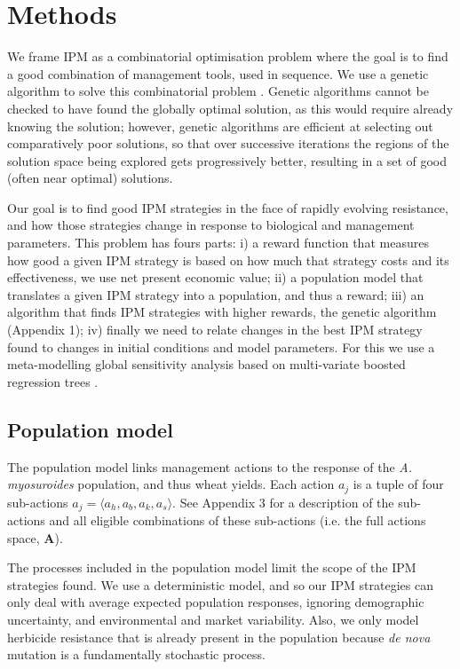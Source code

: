 \documentclass[12pt, a4paper]{article}
\begin{document}
\section*{Methods}
We frame IPM as a combinatorial optimisation problem where the goal is to find a good combination of management tools, used in sequence. We use a genetic algorithm to solve this combinatorial problem \citep{Tayl2004GA, Carr2010}. Genetic algorithms cannot be checked to have found the globally optimal solution, as this would require already knowing the solution; however, genetic algorithms are efficient at selecting out comparatively poor solutions, so that over successive iterations the regions of the solution space being explored gets progressively better, resulting in a set of good (often near optimal) solutions.

Our goal is to find good IPM strategies in the face of rapidly evolving resistance, and how those strategies change in response to biological and management parameters. This problem has fours parts: i) a reward function that measures how good a given IPM strategy is based on how much that strategy costs and its effectiveness, we use net present economic value; ii) a population model that translates a given IPM strategy into a population, and thus a reward; iii) an algorithm that finds IPM strategies with higher rewards, the genetic algorithm (Appendix 1); iv) finally we need to relate changes in the best IPM strategy found to changes in initial conditions and model parameters. For this we use a meta-modelling global sensitivity analysis \citep{Cout2014} based on multi-variate boosted regression trees \citep{Mill2016}. 

\subsection*{Population model}
The population model links management actions to the response of the \textit{A. myosuroides} population, and thus wheat yields. Each action $a_j$ is a tuple of four sub-actions $a_j = \langle a_h, a_b, a_k, a_s \rangle$. See Appendix 3 for a description of the sub-actions and all eligible combinations of these sub-actions (i.e. the full actions space, $\mathbf{A}$). 

The processes included in the population model limit the scope of the IPM strategies found. We use a deterministic model, and so our IPM strategies can only deal with average expected population responses, ignoring demographic uncertainty, and environmental and market variability. Also, we only model herbicide resistance that is already present in the population because \textit{de nova} mutation is a fundamentally stochastic process. 
\end{document}

